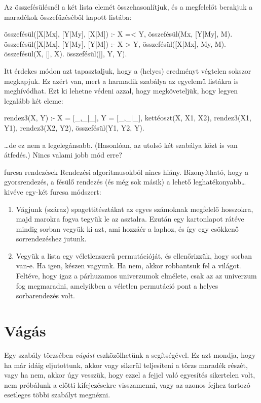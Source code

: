 Az összefésülésnél a két lista elemét
összehasonlítjuk, és a megfelelőt berakjuk a
maradékok összefűzéséből kapott listába:
\begin{program}
összefésül([X|Mx], [Y|My], [X|M]) :-
    X =< Y, összefésül(Mx, [Y|My], M).
összefésül([X|Mx], [Y|My], [Y|M]) :-
    X > Y, összefésül([X|Mx], My, M).
összefésül(X, [], X).
összefésül([], Y, Y).
\end{program}

Itt érdekes módon azt tapasztaljuk, hogy a (helyes)
eredményt végtelen sokszor megkapjuk. Ez azért van,
mert a  harmadik szabálya az egyelemű
listákra is meghívódhat. Ezt ki lehetne védeni
azzal, hogy megköveteljük, hogy legyen legalább két
eleme:
\begin{program}
rendez3(X, Y) :-
    X = [_,_|_], Y = [_,_|_],
    kettéoszt(X, X1, X2),
    rendez3(X1, Y1),
    rendez3(X2, Y2),
    összefésül(Y1, Y2, Y).
\end{program}
\dots de ez nem a legelegánsabb. (Hasonlóan, az
 utolsó két szabálya közt is van
átfedés.) Nincs valami jobb mód erre?

\begin{infobox*}{}{furcsa rendezések}
Rendezési algoritmusokból nincs hiány. Bizonyítható,
hogy a gyorsrendezés, a fésülő rendezés (és még sok
másik) a lehető leghatékonyabb\dots kivéve egy-két
furcsa módszert:
\begin{enumerate}
\item Vágjunk (száraz) spagettitésztákat az egyes
  számoknak megfelelő hosszokra, majd marokra fogva
  tegyük le az asztalra. Ezután egy kartonlapot
  rátéve mindig sorban vegyük ki azt, ami hozzáér a
  laphoz, és így egy csökkenő sorrendezéshez jutunk.
\item Vegyük a lista egy véletlenszerű
  permutációját, és ellenőrizzük, hogy sorban
  van-e. Ha igen, készen vagyunk. Ha nem, akkor
  robbantsuk fel a világot. Feltéve, hogy igaz a
  párhuzamos univerzumok elmélete, csak az az
  univerzum fog megmaradni, amelyikben a véletlen
  permutáció pont a helyes sorbarendezés volt.
\end{enumerate}
\end{infobox*}      

\section{Vágás}
Egy szabály törzsében \emph{vágást} eszközölhetünk a
\pr{!} segítségével. Ez azt mondja, hogy ha már
idáig eljutottunk, akkor vagy sikerül teljesíteni a
törzs maradék részét, vagy ha nem, akkor úgy
vesszük, hogy ezzel a fejjel való egyesítés
sikertelen volt, nem próbálunk a \pr{!} előtti
kifejezésekre visszamenni, vagy az azonos fejhez
tartozó esetleges többi szabályt megnézni.


